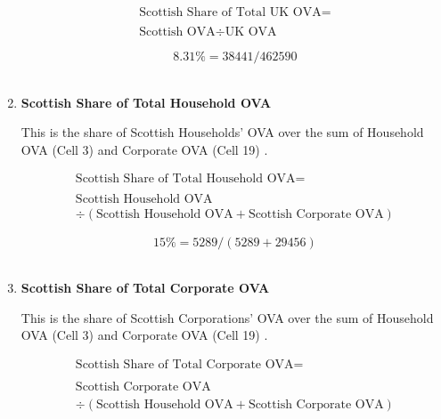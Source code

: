 \begin{enumerate}
\begin{equation}
\begin{split}
\text{Scottish Share of Total UK OVA} =  \\ \\
\text{Scottish OVA}\div \text{UK OVA}
\end{split} \label{eq:2.5.83}
\end{equation}

\begin{equation} \nonumber
8.31\% = 38441/462590
\end{equation}\\


\item \textbf {Scottish Share of Total Household OVA}

This is the share of Scottish Households' OVA over the sum of Household OVA (Cell 3) and Corporate OVA (Cell 19) \cite{ONS2011b, ScotGov2013c}.

\begin{equation}
\begin{split}
\text{Scottish Share of Total Household OVA} =  \\ \\
\text{Scottish Household OVA}\\
\div (\text{Scottish Household OVA}+ \text{Scottish Corporate OVA})
\end{split} \label{eq:2.5.84}
\end{equation}

\begin{equation} \nonumber
15\% = 5289/(5289+29456)
\end{equation}\\


\item \textbf {Scottish Share of Total Corporate OVA}

This is the share of Scottish Corporations' OVA over the sum of Household OVA (Cell 3) and Corporate OVA (Cell 19) \cite{ONS2011b, ScotGov2013c}.

\begin{equation}
\begin{split}
\text{Scottish Share of Total Corporate OVA} =  \\ \\
\text{Scottish Corporate OVA}\\
\div (\text{Scottish Household OVA}+ \text{Scottish Corporate OVA})
\end{split} \label{eq:2.5.85}
\end{equation}


\end{enumerate}
